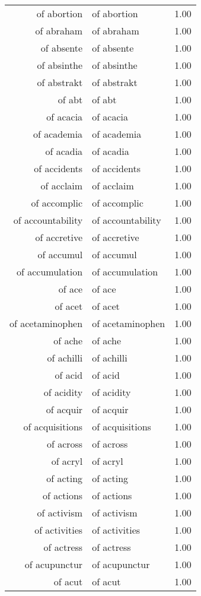 \begin{table}[ht]
\begin{tabular}{rlr}
  of abortion & of abortion & 1.00 \\ 
  of abraham & of abraham & 1.00 \\ 
  of absente & of absente & 1.00 \\ 
  of absinthe & of absinthe & 1.00 \\ 
  of abstrakt & of abstrakt & 1.00 \\ 
  of abt & of abt & 1.00 \\ 
  of acacia & of acacia & 1.00 \\ 
  of academia & of academia & 1.00 \\ 
  of acadia & of acadia & 1.00 \\ 
  of accidents & of accidents & 1.00 \\ 
  of acclaim & of acclaim & 1.00 \\ 
  of accomplic & of accomplic & 1.00 \\ 
  of accountability & of accountability & 1.00 \\ 
  of accretive & of accretive & 1.00 \\ 
  of accumul & of accumul & 1.00 \\ 
  of accumulation & of accumulation & 1.00 \\ 
  of ace & of ace & 1.00 \\ 
  of acet & of acet & 1.00 \\ 
  of acetaminophen & of acetaminophen & 1.00 \\ 
  of ache & of ache & 1.00 \\ 
  of achilli & of achilli & 1.00 \\ 
  of acid & of acid & 1.00 \\ 
  of acidity & of acidity & 1.00 \\ 
  of acquir & of acquir & 1.00 \\ 
  of acquisitions & of acquisitions & 1.00 \\ 
  of across & of across & 1.00 \\ 
  of acryl & of acryl & 1.00 \\ 
  of acting & of acting & 1.00 \\ 
  of actions & of actions & 1.00 \\ 
  of activism & of activism & 1.00 \\ 
  of activities & of activities & 1.00 \\ 
  of actress & of actress & 1.00 \\ 
  of acupunctur & of acupunctur & 1.00 \\ 
  of acut & of acut & 1.00 \\ 

\end{tabular}
\end{table}
